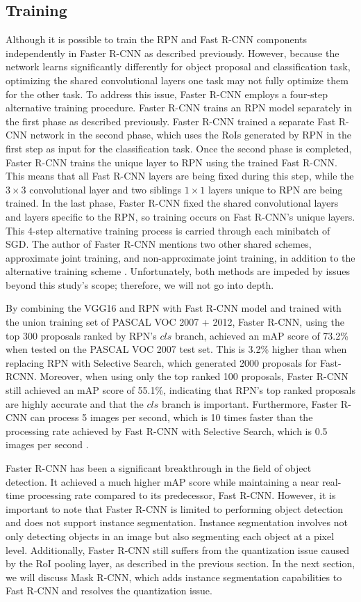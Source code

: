 \subsection{Training}  \label{subsec:faster_rcnn_training}
Although it is possible to train the RPN and Fast R-CNN components independently in Faster R-CNN as described previously. However, because the network learns significantly differently for object proposal and classification task, optimizing the shared convolutional layers one task may not fully optimize them for the other task. To address this issue, Faster R-CNN employs a four-step alternative training procedure. Faster R-CNN trains an RPN model separately in the first phase as described previously. Faster R-CNN trained a separate Fast R-CNN network in the second phase, which uses the RoIs generated by RPN in the first step as input for the classification task. Once the second phase is completed, Faster R-CNN trains the unique layer to RPN using the trained Fast R-CNN. This means that all Fast R-CNN layers are being fixed during this step, while the $3 \times 3$ convolutional layer and two siblings $1 \times 1$ layers unique to RPN are being trained. In the last phase, Faster R-CNN fixed the shared convolutional layers and layers specific to the RPN, so training occurs on Fast R-CNN's unique layers. This 4-step alternative training process is carried through each minibatch of SGD. The author of Faster R-CNN mentions two other shared schemes, approximate joint training, and non-approximate joint training, in addition to the alternative training scheme \cite{faster_rcnn_2015}. Unfortunately, both methods are impeded by issues beyond this study's scope; therefore, we will not go into depth.

By combining the VGG16 and RPN with Fast R-CNN model and trained with the union training set of PASCAL VOC 2007 + 2012, Faster R-CNN, using the top 300 proposals ranked by RPN's $cls$ branch, achieved an mAP score of 73.2\% when tested on the PASCAL VOC 2007 test set. This is 3.2\% higher than when replacing RPN with Selective Search, which generated 2000 proposals for Fast-RCNN. Moreover, when using only the top ranked 100 proposals, Faster R-CNN still achieved an mAP score of 55.1\%, indicating that RPN's top ranked proposals are highly accurate and that the $cls$ branch is important. Furthermore, Faster R-CNN can process 5 images per second, which is 10 times faster than the processing rate achieved by Fast R-CNN with Selective Search, which is 0.5 images per second \cite{faster_rcnn_2015}. 

Faster R-CNN has been a significant breakthrough in the field of object detection. It achieved a much higher mAP score while maintaining a near real-time processing rate compared to its predecessor, Fast R-CNN. However, it is important to note that Faster R-CNN is limited to performing object detection and does not support instance segmentation. Instance segmentation involves not only detecting objects in an image but also segmenting each object at a pixel level. Additionally, Faster R-CNN still suffers from the quantization issue caused by the RoI pooling layer, as described in the previous section. In the next section, we will discuss Mask R-CNN, which adds instance segmentation capabilities to Fast R-CNN and resolves the quantization issue.